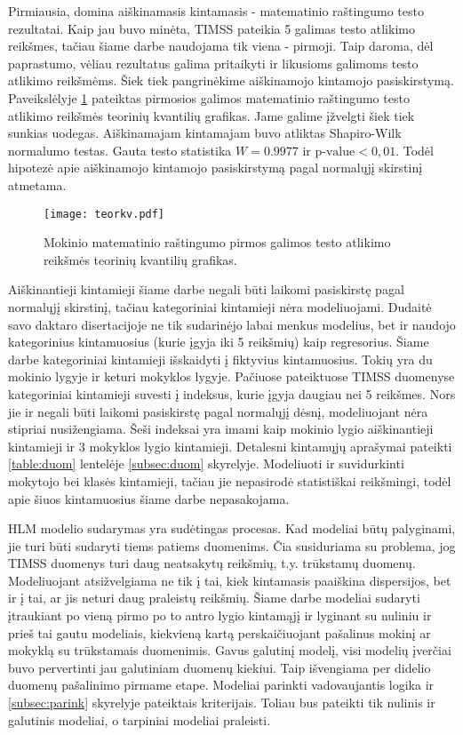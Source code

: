 \documentclass[11pt,a4paper]{article}
\begin{document}
\indent Pirmiausia, domina aiškinamasis kintamasis - matematinio raštingumo testo rezultatai. Kaip jau buvo minėta, TIMSS pateikia 5 galimas testo atlikimo reikšmes, tačiau šiame darbe naudojama tik viena - pirmoji. Taip daroma, dėl paprastumo, vėliau rezultatus galima pritaikyti ir likusioms galimoms testo atlikimo reikšmėms. 
Šiek tiek pangrinėkime aiškinamojo kintamojo pasiskirstymą. Paveikslėlyje \ref{fig:y} pateiktas pirmosios galimos matematinio raštingumo testo atlikimo reikšmės teorinių kvantilių grafikas. Jame galime įžvelgti šiek tiek sunkias uodegas. Aiškinamajam kintamajam buvo atliktas Shapiro-Wilk normalumo testas. Gauta testo statistika $W = 0.9977$ ir $\text{p-value}<0,01$. Todėl hipotezė apie aiškinamojo kintamojo pasiskirstymą pagal normalųjį skirstinį atmetama.

\begin{figure}[H]
\centering
\texttt{[image: teorkv.pdf]}
\caption{Mokinio matematinio raštingumo pirmos galimos testo atlikimo reikšmės teorinių kvantilių grafikas.}
\label{fig:y}
\end{figure}

\indent Aiškinantieji kintamieji šiame darbe negali būti laikomi pasiskirstę pagal normalųjį skirstinį, tačiau kategoriniai kintamieji nėra modeliuojami. Dudaitė savo daktaro disertacijoje \cite{liet2003} ne tik sudarinėjo labai menkus modelius, bet ir naudojo kategorinius kintamuosius (kurie įgyja iki 5 reikšmių) kaip regresorius. Šiame darbe kategoriniai kintamieji išskaidyti į fiktyvius kintamuosius. Tokių yra du mokinio lygyje ir keturi mokyklos lygyje. Pačiuose pateiktuose TIMSS duomenyse kategoriniai kintamieji suvesti į indeksus, kurie įgyja daugiau nei 5 reikšmes. Nors jie ir negali būti laikomi pasiskirstę pagal normalųjį dėsnį, modeliuojant nėra stipriai nusižengiama. Šeši indeksai yra imami kaip mokinio lygio aiškinantieji kintamieji ir 3 mokyklos lygio kintamieji. Detalesni kintamųjų aprašymai pateikti \ref{table:duom} lentelėje \ref{subsec:duom} skyrelyje. Modeliuoti ir suvidurkinti mokytojo bei klasės kintamieji, tačiau jie nepasirodė statistiškai reikšmingi, todėl apie šiuos kintamuosius šiame darbe nepasakojama.

\indent HLM modelio sudarymas yra sudėtingas procesas. Kad modeliai būtų palyginami, jie turi būti sudaryti tiems patiems duomenims. Čia susiduriama su problema, jog TIMSS duomenys turi daug neatsakytų reikšmių, t.y. trūkstamų duomenų. Modeliuojant atsižvelgiama ne tik į tai, kiek kintamasis paaiškina dispersijos, bet ir į tai, ar jis neturi daug praleistų reikšmių. Šiame darbe modeliai sudaryti įtraukiant po vieną pirmo po to antro lygio kintamąjį ir lyginant su nuliniu ir prieš tai gautu modeliais, kiekvieną kartą perskaičiuojant pašalinus mokinį ar mokyklą su trūkstamais duomenimis. Gavus galutinį modelį, visi modelių įverčiai buvo pervertinti jau galutiniam duomenų kiekiui. Taip išvengiama per didelio duomenų pašalinimo pirmame etape. Modeliai parinkti vadovaujantis logika ir \ref{subsec:parink} skyrelyje pateiktais kriterijais. Toliau bus pateikti tik nulinis ir galutinis modeliai, o tarpiniai modeliai praleisti.
\end{document}

